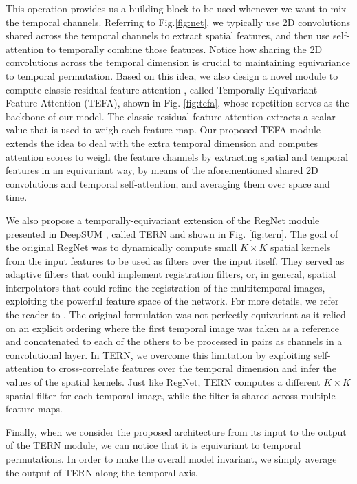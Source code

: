 \documentclass[journal]{IEEEtran}
\begin{document}
This operation provides us a building block to be used whenever we want to mix the temporal channels. Referring to Fig.\ref{fig:net}, we typically use 2D convolutions shared across the temporal channels to extract spatial features, and then use self-attention to temporally combine those features. Notice how sharing the 2D convolutions across the temporal dimension is crucial to maintaining equivariance to temporal permutation. Based on this idea, we also design a novel module to compute classic residual feature attention \cite{zhang2018image}, called Temporally-Equivariant Feature Attention (TEFA), shown in Fig. \ref{fig:tefa}, whose repetition serves as the backbone of our model. The classic residual feature attention \cite{zhang2018image} extracts a scalar value that is used to weigh each feature map. Our proposed TEFA module extends the idea to deal with the extra temporal dimension and computes attention scores to weigh the feature channels by extracting spatial and temporal features in an equivariant way, by means of the aforementioned shared 2D convolutions and temporal self-attention, and averaging them over space and time.

We also propose a temporally-equivariant extension of the RegNet module presented in DeepSUM \cite{molini2019deepsum}, called TERN and shown in Fig. \ref{fig:tern}. The goal of the original RegNet was to dynamically compute small $K \times K$ spatial kernels from the input features to be used as filters over the input itself. They served as adaptive filters that could implement registration filters, or, in general, spatial interpolators that could refine the registration of the multitemporal images, exploiting the powerful feature space of the network. For more details, we refer the reader to \cite{molini2019deepsum}. The original formulation was not perfectly equivariant as it relied on an explicit ordering where the first temporal image was taken as a reference and concatenated to each of the others to be processed in pairs as channels in a convolutional layer. In TERN, we overcome this limitation by exploiting self-attention to cross-correlate features over the temporal dimension and infer the values of the spatial kernels. Just like RegNet, TERN computes a different $K \times K$ spatial filter for each temporal image, while the filter is shared across multiple feature maps.

Finally, when we consider the proposed architecture from its input to the output of the TERN module, we can notice that it is equivariant to temporal permutations. In order to make the overall model invariant, we simply average the output of TERN along the temporal axis.
\end{document}
